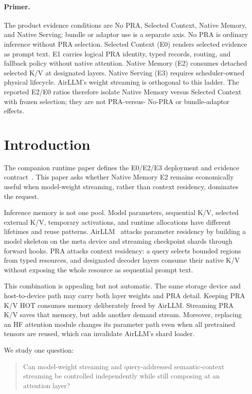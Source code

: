 \documentclass[10pt]{article}
\begin{document}
\paragraph{Primer.}
The product evidence conditions are No PRA, Selected Context, Native Memory,
and Native Serving; bundle or adaptor use is a separate axis. No PRA is
ordinary inference without PRA selection. Selected Context (E0) renders
selected evidence as prompt text. E1 carries logical PRA identity, typed
records, routing, and fallback policy without native attention. Native Memory
(E2) consumes detached selected K/V at designated layers. Native Serving (E3)
requires scheduler-owned physical lifecycle. AirLLM's weight streaming is
orthogonal to this ladder. The reported E2/E0 ratios therefore isolate Native
Memory versus Selected Context with frozen selection; they are not PRA-versus-
No-PRA or bundle-adaptor effects.

\section{Introduction}
The companion runtime paper defines the E0/E2/E3 deployment and evidence
contract~\cite{praruntime}. This paper asks whether Native Memory E2 remains
economically useful when model-weight streaming, rather than context residency,
dominates the request.

Inference memory is not one pool. Model parameters, sequential K/V, selected
external K/V, temporary activations, and runtime allocations have different
lifetimes and reuse patterns. AirLLM~\cite{airllm} attacks parameter residency
by building a model skeleton on the meta device and streaming checkpoint shards
through forward hooks. PRA attacks context residency: a query selects bounded
regions from typed resources, and designated decoder layers consume their
native K/V without exposing the whole resource as sequential prompt text.

This combination is appealing but not automatic. The same storage device and
host-to-device path may carry both layer weights and PRA detail. Keeping PRA K/V
HOT consumes memory deliberately freed by AirLLM. Streaming PRA K/V saves that
memory, but adds another demand stream. Moreover, replacing an HF attention
module changes its parameter path even when all pretrained tensors are reused,
which can invalidate AirLLM's shard loader.

We study one question:
\begin{quote}
Can model-weight streaming and query-addressed semantic-context streaming be
controlled independently while still composing at an attention layer?
\end{quote}
\end{document}
